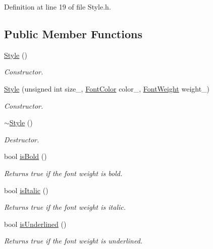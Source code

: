 Definition at line 19 of file Style.h.\subsection*{Public Member Functions}
\begin{CompactItemize}
\item 
\hyperlink{class_style_914f187818eb30c0cebe3df5378bfa0a}{Style} ()
\begin{CompactList}\small\item\em Constructor. \item\end{CompactList}\item 
\hyperlink{class_style_1d6e412d4343b4a6eb4253b6456928b6}{Style} (unsigned int size\_\-, \hyperlink{struct_font_color}{FontColor} color\_\-, \hyperlink{_font_weight_8h_ecff23ba4a68486421bcea57e095fe66}{FontWeight} weight\_\-)
\begin{CompactList}\small\item\em Constructor. \item\end{CompactList}\item 
\hyperlink{class_style_7c798ef9b77bc94719542feade497725}{$\sim$Style} ()
\begin{CompactList}\small\item\em Destructor. \item\end{CompactList}\item 
bool \hyperlink{class_style_7f1c573688f781a3d6081194c84affba}{isBold} ()
\begin{CompactList}\small\item\em Returns true if the font weight is bold. \item\end{CompactList}\item 
bool \hyperlink{class_style_a1f4e590f1d15f37fddda4d1a7efeb51}{isItalic} ()
\begin{CompactList}\small\item\em Returns true if the font weight is italic. \item\end{CompactList}\item 
bool \hyperlink{class_style_25d84b39fcd4fb608a1b323c99ea8678}{isUnderlined} ()
\begin{CompactList}\small\item\em Returns true if the font weight is underlined. \item\end{CompactList}\item 

\end{CompactItemize}
